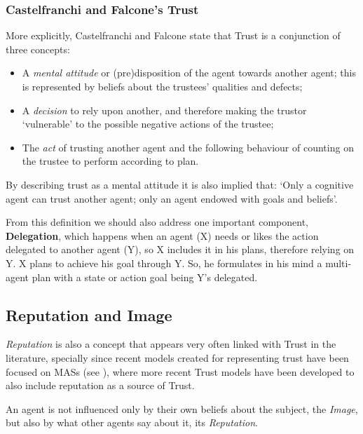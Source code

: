 \subsubsection{Castelfranchi and Falcone's Trust}
\label{subsubsec:CastelfranchiTrust}
More explicitly, Castelfranchi and Falcone\cite{Castelfranchi1998} state that Trust is a conjunction of three concepts:
\begin{itemize}
	\item A \textit{mental attitude} or (pre)disposition of the agent towards another agent; this is represented by beliefs about the trustees' qualities and defects;
	\item A \textit{decision} to rely upon another, and therefore making the trustor `vulnerable' to the possible negative actions of the trustee;
	\item The \textit{act} of trusting another agent and the following behaviour of counting on the trustee to perform according to plan. 
\end{itemize}
By describing trust as a mental attitude it is also implied that: `Only a cognitive agent can trust another agent; only an agent endowed with goals and beliefs'\cite{Castelfranchi2010}.

From this definition we should also address one important component, \textbf{Delegation}, which happens when an agent (X) needs or likes the action delegated to another agent (Y), so X includes it in his plans, therefore relying on Y. X plans to achieve his goal through Y. So, he formulates in his mind a multi-agent plan with a state or action goal being Y’s delegated\cite{Castelfranchi1998}.



\subsection{Reputation and Image}
\label{subsec:Reputation}
\textit{Reputation} is also a concept that appears very often linked with Trust in the literature, specially since recent models created for representing trust have been focused on \acp{MAS} (see \cite{Abdul-rahman2000, Sabater2002, Sabater2006, Huynh2006, Pinyol2009}), where more recent Trust models have been developed to also include reputation as a source of Trust.

An agent is not influenced only by their own beliefs about the subject, the \textit{Image}, but also by what other agents say about it, its \textit{Reputation}.

